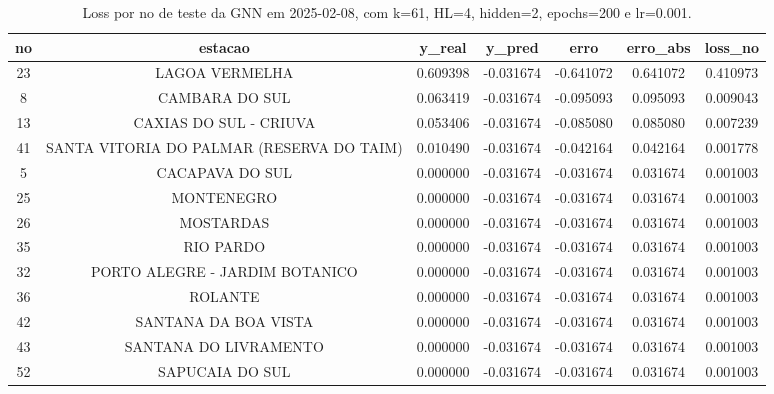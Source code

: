 \begin{table}[h]
\centering
\caption{Loss por no de teste da GNN em 2025-02-08, com k=61, HL=4, hidden=2, epochs=200 e lr=0.001.}
\label{tab:gnn_loss_k61_hl4_h2_e200_d20250208}
\begin{tabular}{ccccccc}
\toprule
no & estacao & y\_real & y\_pred & erro & erro\_abs & loss\_no \\
\midrule
23 & LAGOA VERMELHA & 0.609398 & -0.031674 & -0.641072 & 0.641072 & 0.410973 \\
8 & CAMBARA DO SUL & 0.063419 & -0.031674 & -0.095093 & 0.095093 & 0.009043 \\
13 & CAXIAS DO SUL - CRIUVA & 0.053406 & -0.031674 & -0.085080 & 0.085080 & 0.007239 \\
41 & SANTA VITORIA DO PALMAR (RESERVA DO TAIM) & 0.010490 & -0.031674 & -0.042164 & 0.042164 & 0.001778 \\
5 & CACAPAVA DO SUL & 0.000000 & -0.031674 & -0.031674 & 0.031674 & 0.001003 \\
25 & MONTENEGRO & 0.000000 & -0.031674 & -0.031674 & 0.031674 & 0.001003 \\
26 & MOSTARDAS & 0.000000 & -0.031674 & -0.031674 & 0.031674 & 0.001003 \\
35 & RIO PARDO & 0.000000 & -0.031674 & -0.031674 & 0.031674 & 0.001003 \\
32 & PORTO ALEGRE - JARDIM BOTANICO & 0.000000 & -0.031674 & -0.031674 & 0.031674 & 0.001003 \\
36 & ROLANTE & 0.000000 & -0.031674 & -0.031674 & 0.031674 & 0.001003 \\
42 & SANTANA DA BOA VISTA & 0.000000 & -0.031674 & -0.031674 & 0.031674 & 0.001003 \\
43 & SANTANA DO LIVRAMENTO & 0.000000 & -0.031674 & -0.031674 & 0.031674 & 0.001003 \\
52 & SAPUCAIA DO SUL & 0.000000 & -0.031674 & -0.031674 & 0.031674 & 0.001003 \\
\bottomrule
\end{tabular}
\end{table}
